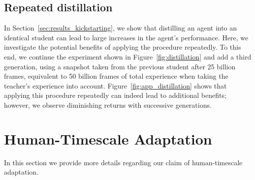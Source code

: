\documentclass[11pt, a4paper, logo, copyright]{deepmind}
\begin{document}
\begin{appendix}
\subsection{Repeated distillation}
\label{app:repeated_distillation}
In Section~\ref{sec:results_kickstarting}, we show that distilling an agent into an identical student can lead to large increases in the agent's performance. Here, we investigate the potential benefits of applying the procedure repeatedly. To this end, we continue the experiment shown in Figure~\ref{fig:distillation} and add a third generation, using a snapshot taken from the previous student after 25 billion frames, equivalent to 50 billion frames of total experience when taking the teacher's experience into account. Figure~\ref{fig:app_distillation} shows that applying this procedure repeatedly can indeed lead to additional benefits; however, we observe diminishing returns with successive generations.
\section{Human-Timescale Adaptation}\label{appendix:human_scale_adaptation}
In this section we provide more details regarding our claim of human-timescale adaptation.

\end{appendix}
\end{document}
